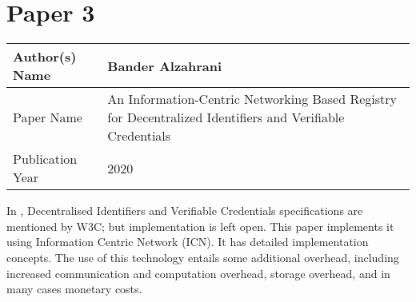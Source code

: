 \section{Paper 3}
    \begin{center}
    \begin{tabular}{ | m{5em} | m{25em} |} 
      \hline
      Author(s) Name & Bander Alzahrani \\ 
      \hline
      Paper Name & An Information-Centric Networking Based Registry for Decentralized Identifiers and Verifiable Credentials \\ 
      \hline
      Publication Year & 2020 \\ 
      \hline
    \end{tabular}
    \end{center}
    In \cite{9146840}, Decentralised Identifiers and Verifiable Credentials specifications are mentioned by W3C; but implementation is left open. This paper implements it using Information Centric Network (ICN). It has detailed implementation concepts. The use of this technology entails some additional overhead, including increased communication and computation overhead, storage overhead, and in many cases monetary costs.
